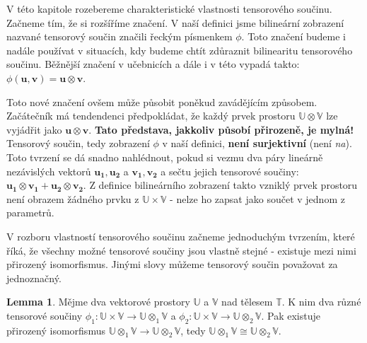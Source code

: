\documentclass[a5paper,12pt]{amsbook}
\theoremstyle{definition}
\newtheorem{lemma}[theorem]{Lemma}
\newcommand{\myvec}[1]{\mathbf{#1}}
\newcommand{\myspace}[1]{\mathbb{#1}}
\begin{document}
\noindent
V této kapitole rozebereme charakteristické vlastnosti tensorového součinu. Začneme tím, že si rozšíříme
značení. V naší definici jsme bilineární zobrazení nazvané tensorový součin značili řeckým písmenkem
$\phi$. Toto značení budeme i nadále používat v situacích, kdy budeme chtít zdůraznit bilinearitu
tensorového součinu. Běžnější značení v učebnicích a dále i v této vypadá takto: $\phi(\myvec{u}, \myvec{v}) = \myvec{u}\otimes\myvec{v}$.

Toto nové značení ovšem může působit poněkud zavádějícím způsobem. Začátečník má tendendenci předpokládat,
že každý prvek prostoru $\myspace{U}\otimes\myspace{V}$ lze vyjádřit jako $\myvec{u}\otimes\myvec{v}$.
\textbf{Tato představa, jakkoliv působí přirozeně, je mylná!} Tensorový součin, tedy zobrazení $\phi$
v naší definici, \textbf{není surjektivní} (není \textit{na}). Toto tvrzení se dá snadno nahlédnout,
pokud si vezmu dva páry lineárně nezávislých vektorů $\myvec{u_1}, \myvec{u_2}$ a $\myvec{v_1}, \myvec{v_2}$
a sečtu jejich tensorové součiny: $\myvec{u_1}\otimes\myvec{v_1} + \myvec{u_2}\otimes\myvec{v_2}$.
Z definice bilineárního zobrazení takto vzniklý prvek prostoru není obrazem žádného prvku z
$\myspace{U}\times\myspace{V}$ - nelze ho zapsat jako součet v jednom z parametrů.

\medskip\noindent
V rozboru vlastností tensorového součinu začneme jednoduchým tvrzením, které říká, že všechny možné
tensorové součiny jsou vlastně stejné - existuje mezi nimi přirozený isomorfismus. Jinými slovy
můžeme tensorový součin považovat za jednoznačný.

\begin{lemma}
Mějme dva vektorové prostory $\myspace{U}$ a $\myspace{V}$ nad tělesem $\myspace{T}$. K nim dva
různé tensorové součiny $\phi_1: \myspace{U}\times\myspace{V}\rightarrow\myspace{U}\otimes_1\myspace{V}$
a $\phi_2: \myspace{U}\times\myspace{V}\rightarrow\myspace{U}\otimes_2\myspace{V}$. Pak existuje
přirozený isomorfismus $\myspace{U}\otimes_1\myspace{V}\rightarrow\myspace{U}\otimes_2\myspace{V}$,
tedy $\myspace{U}\otimes_1\myspace{V}\cong\myspace{U}\otimes_2\myspace{V}$.
\end{lemma}
\end{document}
